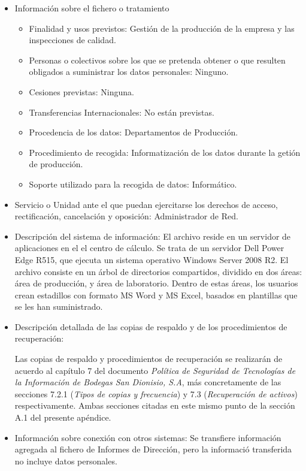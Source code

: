 \documentclass[a4paper,11pt,bibtotoc,noliststotoc]{scrbook}
\begin{document}
\begin{itemize}
\item Información sobre el fichero o tratamiento
	\begin{itemize}
	\item Finalidad y usos previstos: Gestión de la producción de la empresa y las inspecciones de calidad.
	\item Personas o colectivos sobre los que se pretenda obtener o que resulten obligados a suministrar los datos personales: Ninguno.
	\item Cesiones previstas: Ninguna.
	\item Transferencias Internacionales: No están previstas.
	\item Procedencia de los datos: Departamentos de Producción.
	\item Procedimiento de recogida: Informatización de los datos durante la getión de producción.
	\item Soporte utilizado para la recogida de datos: Informático.
	\end{itemize}

\item Servicio o Unidad ante el que puedan ejercitarse los derechos de acceso, rectificación, cancelación y oposición: Administrador de Red.

\item Descripción del sistema de información: El archivo reside en un servidor de aplicaciones en el el centro de cálculo. Se trata de un servidor Dell Power Edge R515, que ejecuta un sistema operativo Windows Server 2008 R2. El archivo consiste en un árbol de directorios compartidos, dividido en dos áreas: área de producción, y área de laboratorio. Dentro de estas áreas, los usuarios crean estadillos con formato MS Word y MS Excel, basados en plantillas que se les han suministrado.

\item Descripción detallada de las copias de respaldo y de los procedimientos de recuperación:

Las copias de respaldo y procedimientos de recuperación se realizarán de acuerdo al capítulo 7 del documento \emph{Política de Seguridad de Tecnologías de la Información de Bodegas San Dionisio, S.A}, más concretamente de las secciones 7.2.1 (\emph{Tipos de copias y frecuencia}) y 7.3 (\emph{Recuperación de activos}) respectivamente. Ambas secciones citadas en este mismo punto de la sección A.1 del presente apéndice.

\item Información sobre conexión con otros sistemas: Se transfiere información agregada al fichero de Informes de Dirección, pero la informació transferida no incluye datos personales.


\end{itemize}
\end{document}
